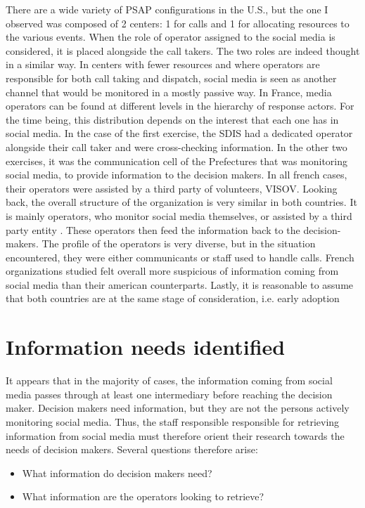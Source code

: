 There are a wide variety of PSAP configurations in the U.S., but the one I observed was composed of 2 centers:
1 for calls and 1 for allocating resources to the various events.
When the role of operator assigned to the social media is considered, it is placed alongside the call takers.
The two roles are indeed thought in a similar way.
In centers with fewer resources and where operators are responsible for both call taking and dispatch,
social media is seen as another channel that would be monitored in a mostly passive way.
In France, media operators can be found at different levels in the hierarchy of response actors.
For the time being, this distribution depends on the interest that each one has in social media.
In the case of the first exercise, the SDIS had a dedicated operator alongside their call taker
and were cross-checking information.
In the other two exercises, it was the communication cell of the Prefectures that was
monitoring social media, to provide information to the decision makers.
In all french cases, their operators were assisted by a third party of volunteers, VISOV.
Looking back, the overall structure of the organization is very similar in both countries.
It is mainly operators, who monitor social media themselves, or
assisted by a third party entity \parencite{batardIntegrerContributionsCitoyennes2021}.
These operators then feed the information back to the decision-makers.
The profile of the operators is very diverse, but in the situation encountered, they
were either communicants or staff used to handle calls.
French organizations studied felt overall more suspicious of information coming from
social media \parencite{castagninoWhatCanWe2019} than their american counterparts.
Lastly, it is reasonable to assume that both countries are at the same stage of consideration, i.e. early adoption

\section{Information needs identified}
It appears that in the majority of cases, the information coming from social media passes through at least one intermediary before reaching the decision maker.
Decision makers need information, but they are not the persons actively monitoring social media.
Thus, the staff responsible responsible for retrieving information from social media must therefore orient their research towards the needs of decision makers.
Several questions therefore arise:

\begin{itemize}
    \item What information do decision makers need?
    \item What information are the operators looking to retrieve?
\end{itemize}

